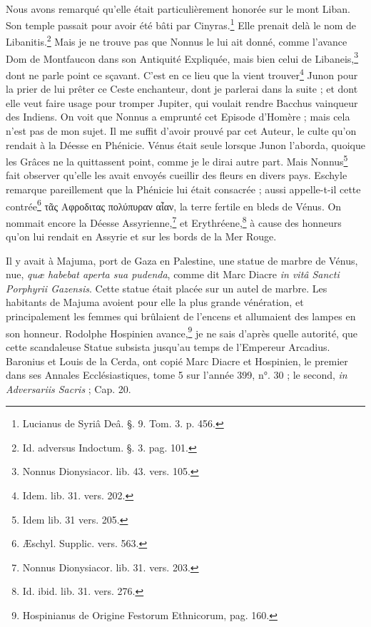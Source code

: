 \documentclass[a4paper, 18pt, oneside]{article}
\begin{document}
\paragraph{}
Nous avons remarqué qu'elle était particulièrement honorée sur le mont Liban. Son temple passait pour avoir été bâti par Cinyras.\footnote{Lucianus de Syriâ Deâ. §. 9. Tom. 3. p. 456.} Elle prenait delà le nom de Libanitis.\footnote{Id. adversus Indoctum. §. 3. pag. 101.} Mais je ne trouve pas que Nonnus le lui ait donné, comme l'avance Dom de Montfaucon dans son Antiquité Expliquée, mais bien celui de Libaneis,\footnote{Nonnus Dionysiacor. lib. 43. vers. 105.} dont ne parle point ce sçavant. C'est en ce lieu que la vient trouver\footnote{Idem. lib. 31. vers. 202.} Junon pour la prier de lui prêter ce Ceste enchanteur, dont je parlerai dans la suite ; et dont elle veut faire usage pour tromper Jupiter, qui voulait rendre Bacchus vainqueur des Indiens. On voit que Nonnus a emprunté cet Episode d'Homère ; mais cela n'est pas de mon sujet. Il me suffit d'avoir prouvé par cet Auteur, le culte qu'on rendait à la Déesse en Phénicie. Vénus était seule lorsque Junon l'aborda, quoique les Grâces ne la quittassent point, comme je le dirai autre part. Mais Nonnus\footnote{Idem lib. 31 vers. 205.} fait observer qu'elle les avait envoyés cueillir des fleurs en divers pays. Eschyle remarque pareillement que la Phénicie lui était consacrée ; aussi appelle-t-il cette contrée\footnote{Æschyl. Supplic. vers. 563.} τᾶς Αφροδιτας πολύπυραν αἶαν, la terre fertile en bleds de Vénus. On nommait encore la Déesse Assyrienne,\footnote{Nonnus Dionysiacor. lib. 31. vers. 203.} et Erythréene,\footnote{Id. ibid. lib. 31. vers. 276.} à cause des honneurs qu'on lui rendait en Assyrie et sur les bords de la Mer Rouge.

Il y avait à Majuma, port de Gaza en Palestine, une statue de marbre de Vénus, nue, \emph{quæ habebat aperta sua pudenda}, comme dit Marc Diacre \emph{in vitâ Sancti Porphyrii Gazensis}. Cette statue était placée sur un autel de marbre. Les habitants de Majuma avoient pour elle la plus grande vénération, et principalement les femmes qui brûlaient de l'encens et allumaient des lampes en son honneur. Rodolphe Hospinien avance,\footnote{Hospinianus de Origine Festorum Ethnicorum, pag. 160.} je ne sais d'après quelle autorité, que cette scandaleuse Statue subsista jusqu'au temps de l'Empereur Arcadius. Baronius et Louis de la Cerda, ont copié Marc Diacre et Hospinien, le premier dans ses Annales Ecclésiastiques, tome 5 sur l'année 399, n°. 30 ; le second, \emph{in Adversariis Sacris} ; Cap. 20.
\end{document}
